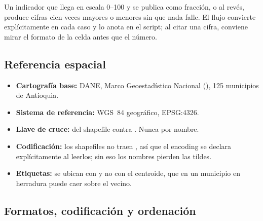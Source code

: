 \documentclass[11pt,a4paper]{article}
\begin{document}
\begin{advertencia}[title={Una unidad que hay que declarar siempre}]
Un indicador que llega en escala 0--100 y se publica como fracción, o al revés,
produce cifras cien veces mayores o menores sin que nada falle. El flujo
convierte explícitamente en cada caso y lo anota en el script; al citar una
cifra, conviene mirar el formato de la celda antes que el número.
\end{advertencia}

\subsection{Referencia espacial}

\begin{itemize}[leftmargin=*, itemsep=2pt]
  \item \textbf{Cartografía base:} DANE, Marco Geoestadístico Nacional
    (), 125 municipios de
    Antioquia.
  \item \textbf{Sistema de referencia:} WGS~84 geográfico, EPSG:4326.
  \item \textbf{Llave de cruce:}  del shapefile contra
    . Nunca por nombre.
  \item \textbf{Codificación:} los shapefiles no traen , así que el
    encoding se declara explícitamente al leerlos; sin eso los nombres pierden
    las tildes.
  \item \textbf{Etiquetas:} se ubican con  y no con el
    centroide, que en un municipio en herradura puede caer sobre el vecino.
\end{itemize}

\subsection{Formatos, codificación y ordenación}
\end{document}

